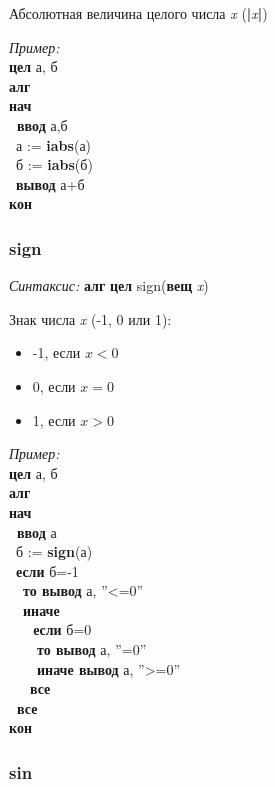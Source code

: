 \documentclass[12pt,a4paper]{article}
\newcommand{\otstup}{\textperiodcentered\ }
\begin{document}
     
 
      Абсолютная величина целого числа \emph{x} (\textbf{|}\emph{x}\textbf{|})
      
\emph{Пример:} 
\sffamily
~\\\textbf{цел} а, б
~\\\textbf{алг
~\\нач
~\\\otstup ввод} а,б
~\\\otstup а := \textbf{iabs}(а)
~\\\otstup б := \textbf{iabs}(б)
~\\\otstup \textbf{вывод} а+б
~\\\textbf{кон}

\normalfont
\subsubsection{sign}

\emph{Синтаксис:} \textbf{алг} \textbf{цел} sign(\textbf{вещ} \emph{x})


      

      Знак числа \emph{x} (-1, 0 или 1):
\begin{itemize}
\item      -1, если $x < 0$
\item      0, если  $x=0$
\item      1, если $x>0$
\end{itemize}
 
\emph{Пример:}
\sffamily
~\\\textbf{цел} а, б
~\\\textbf{алг 
~\\нач
~\\\otstup ввод} а
~\\\otstup б := \textbf{sign}(а)
~\\\otstup \textbf{если} б=-1
~\\\otstup \otstup \textbf{то вывод} а, ''<=0''
~\\\otstup \otstup  \textbf{иначе 
~\\\otstup \otstup \otstup  если} б=0
~\\\otstup \otstup \otstup \otstup  \textbf{то вывод} а, ''=0''
~\\\otstup \otstup \otstup \otstup  \textbf{иначе вывод} а, ''>=0''
~\\\otstup \otstup \otstup \textbf{все
~\\\otstup все
~\\кон}

\normalfont
\subsubsection{sin}
\end{document}
